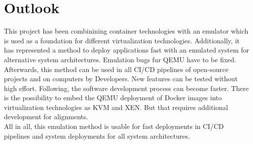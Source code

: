 \chapter{Outlook}\label{ch:outlook}

This project has been combinining container technologies with an emulator which is used as a foundation for different virtualization technologies. 
Additionally, it has represented a method to deploy applications fast with an emulated system for alternative system architectures.
Emulation bugs fur QEMU have to be fixed. Afterwards, this method can be used in all CI/CD pipelines of open-source projects and on computers by Developers.
New features can be tested without high effort. Following, the software development process can become faster.
There is the possibility to embed the QEMU deployment of Docker images into virtualization technologies as KVM and XEN.
But that requires additional development for alignments. \\
All in all, this emulation method is usable for fast deployments in CI/CD pipelines and system deployments for all system architectures.
